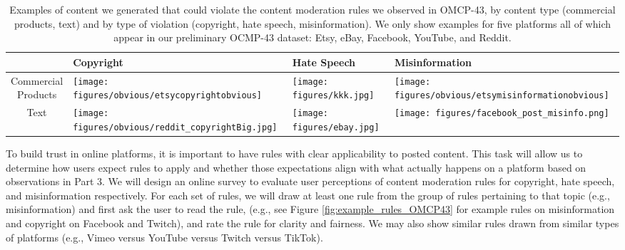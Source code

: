 \label{sec:rule-implementation}
\begin{table}[t]
    \begin{tabularx}{\textwidth}{c | X | X | X}
        & {\bf Copyright} & {\bf Hate Speech} & {\bf Misinformation} \\ \hline
        \parbox{0.7in}{Commercial\\ Products} &
        \parbox[c]{\hsize}{\texttt{[image: figures/obvious/etsycopyrightobvious]}} &
        \parbox[c]{\hsize}{\texttt{[image: figures/kkk.jpg]}} &
        \parbox[c]{\hsize}{\texttt{[image: figures/obvious/etsymisinformationobvious]}}
        \\ \hline
    Text & 
        \parbox[c]{\hsize}{\texttt{[image: figures/obvious/reddit\_copyrightBig.jpg]}}  & 
        \parbox[c]{\hsize}{\texttt{[image: figures/ebay.jpg]}} & 
      \parbox[c]{\hsize}{\texttt{[image: figures/facebook\_post\_misinfo.png]}} 
        \\ \hline
    \end{tabularx}
    \caption{Examples of content we generated that could violate the content moderation
    rules we observed in OMCP-43, by content type (commercial products, 
    text) and by type of violation (copyright, hate speech, misinformation).
    We only show examples for five platforms all of which appear in our preliminary OCMP-43 dataset: Etsy, eBay, Facebook, YouTube, and Reddit.}
    \label{tab:example_content}
\end{table}
\fi

To build trust in online platforms, it is important to have rules with clear applicability to posted content. This task will allow us to determine how users expect rules to apply and whether those expectations align with what actually happens on a
platform based on observations in Part 3. We will design an
online survey to evaluate user perceptions of content
moderation rules for copyright, hate speech, and misinformation respectively.
For each set of rules, we will draw at least one rule from the group of rules
pertaining to that topic (e.g., misinformation) and first ask the user to read
the rule, (e.g., see Figure \ref{fig:example_rules_OMCP43} for example rules on misinformation and copyright on Facebook and Twitch), and rate the rule for clarity and fairness. We may also show similar rules drawn from similar types of platforms (e.g., Vimeo versus YouTube versus Twitch versus TikTok).

